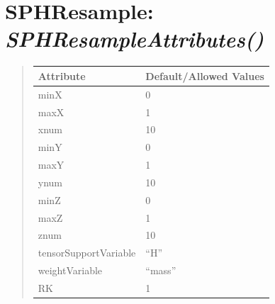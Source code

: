 \documentclass[letterpaper,10pt,english]{sphinxmanual}
\begin{document}
\section{\textbf{SPHResample}: \emph{SPHResampleAttributes()}}
\label{attributes:sphresample-sphresampleattributes}
\begin{DUlineblock}{0em}
\item[] 
\end{DUlineblock}
\begin{quote}

\begin{tabulary}{\linewidth}{|L|L|}
\hline

\textbf{Attribute}
 & 
\textbf{Default/Allowed Values}
\\
\hline
minX
 & 
0
\\
\hline
maxX
 & 
1
\\
\hline
xnum
 & 
10
\\
\hline
minY
 & 
0
\\
\hline
maxY
 & 
1
\\
\hline
ynum
 & 
10
\\
\hline
minZ
 & 
0
\\
\hline
maxZ
 & 
1
\\
\hline
znum
 & 
10
\\
\hline
tensorSupportVariable
 & 
``H''
\\
\hline
weightVariable
 & 
``mass''
\\
\hline
RK
 & 
1
\\
\hline\end{tabulary}

\end{quote}

\begin{DUlineblock}{0em}
\item[] 
\end{DUlineblock}

\begin{DUlineblock}{0em}
\item[] 
\end{DUlineblock}
\end{document}
